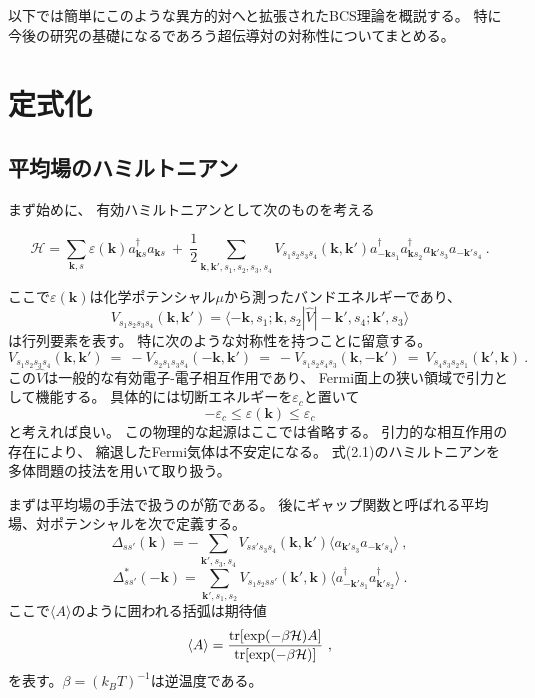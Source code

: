 \documentclass[uplatex,a4j,12pt,dvipdfmx]{jsarticle}
\begin{document}
以下では簡単にこのような異方的対へと拡張されたBCS理論を概説する。
特に今後の研究の基礎になるであろう超伝導対の対称性についてまとめる。

\section{定式化}

\subsection{平均場のハミルトニアン}

まず始めに、
有効ハミルトニアンとして次のものを考える

$$
	\mathcal{H}
	=
	\sum_{\bm{k},s}
	\varepsilon(\bm{k})
	a_{\bm{k} s}^{\dagger}
	a_{\bm{k} s}
	\ + \
	\dfrac{1}{2}
	\sum_{\bm{k},\bm{k}',s_{1},s_{2},s_{3},s_{4}}
	V_{s_{1} s_{2} s_{3} s_{4}}(\bm{k},\bm{k}')
	a_{-\bm{k} s_{1}}^{\dagger}
	a_{\bm{k} s_{2}}^{\dagger}
	a_{\bm{k}' s_{3}}
	a_{-\bm{k}' s_{4}}
	\ .
$$

ここで$\varepsilon(\bm{k})$は化学ポテンシャル$\mu$から測ったバンドエネルギーであり、
\[
	V_{s_{1} s_{2} s_{3} s_{4}}(\bm{k},\bm{k}')
	=
	\langle
	- \bm{k} , s_{1} ; \bm{k} , s_{2}
	|
	\hat{V}
	|
	- \bm{k}' , s_{4} ; \bm{k}' , s_{3}
	\rangle
\]
は行列要素を表す。
特に次のような対称性を持つことに留意する。
\[
	V_{s_{1} s_{2} s_{3} s_{4}}(\bm{k},\bm{k}')
	\ = \
	- V_{s_{2} s_{1} s_{3} s_{4}}( - \bm{k},\bm{k}')
	\ = \
	- V_{s_{1} s_{2} s_{4} s_{3}}(\bm{k}, - \bm{k}')
	\ = \
	V_{s_{4} s_{3} s_{2} s_{1}}( \bm{k}' , \bm{k})
	\ .
\]
この$\hat{V}$は一般的な有効電子-電子相互作用であり、
Fermi面上の狭い領域で引力として機能する。
具体的には切断エネルギーを$\varepsilon_{c}$と置いて
\[
	-
	\varepsilon_{c}
	\leq
	\varepsilon(\bm{k})
	\leq
	\varepsilon_{c}
\]
と考えれば良い。
この物理的な起源はここでは省略する。
引力的な相互作用の存在により、
縮退したFermi気体は不安定になる。
式(2.1)のハミルトニアンを多体問題の技法を用いて取り扱う。

まずは平均場の手法で扱うのが筋である。
後にギャップ関数と呼ばれる平均場、対ポテンシャルを次で定義する。
\[
	\Delta_{s s'}(\bm{k})
	=
	- \sum_{ \bm{k}' , s_{3} , s_{4} }
	V_{s s' s_{3} s_{4} }(\bm{k},\bm{k}')
	\langle
	a_{ \bm{k}' s_{3} }
	a_{ - \bm{k}' s_{4} }
	\rangle
	\ ,
\]\[
	\Delta_{s s'}^{*}( - \bm{k} )
	=
	\sum_{ \bm{k}' , s_{1} , s_{2} }
	V_{ s_{1} s_{2} s s' }(\bm{k}',\bm{k})
	\langle
	a_{ - \bm{k}' s_{1} }^{\dagger}
	a_{ \bm{k}' s_{2} }^{\dagger}
	\rangle
	\ .
\]
ここで$\langle A \rangle$のように囲われる括弧は期待値
\[
	\langle A \rangle
	=
	\dfrac{ {\rm tr} [ {\rm exp} ( - \beta \mathcal{H} ) A ]  }{ {\rm tr} [ {\rm exp} ( - \beta \mathcal{H} ) ] }
	\ ,
\]
を表す。$\beta = (k_{B} T)^{-1}$は逆温度である。
\end{document}
